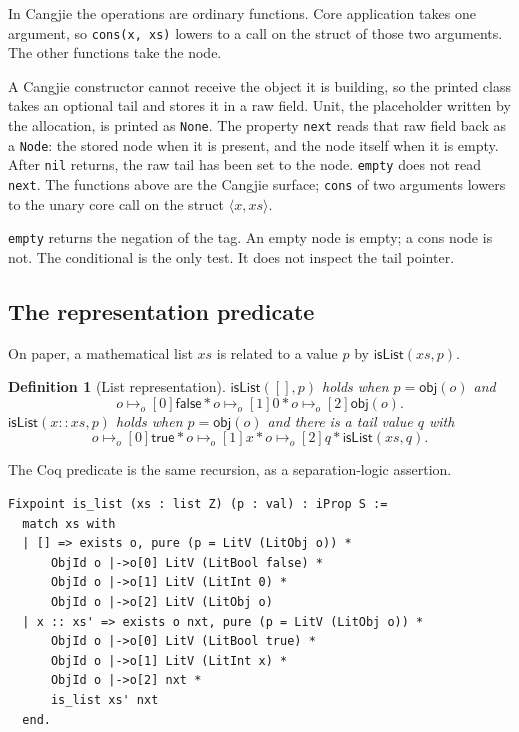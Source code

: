 \documentclass[11pt]{article}
\newtheorem{definition}[theorem]{Definition}
\newcommand{\True}{\mathsf{true}}
\newcommand{\False}{\mathsf{false}}
\newcommand{\ptso}{\mathrel{\mapsto_{o}}}
\newcommand{\sep}{\mathbin{*}}
\begin{document}
In Cangjie the operations are ordinary functions.
Core application takes one argument, so \texttt{cons(x, xs)} lowers to a call on the struct of those two arguments.
The other functions take the node.



A Cangjie constructor cannot receive the object it is building, so the printed class takes an optional tail and stores it in a raw field.
Unit, the placeholder written by the allocation, is printed as \texttt{None}.
The property \texttt{next} reads that raw field back as a \texttt{Node}: the stored node when it is present, and the node itself when it is empty.
After \texttt{nil} returns, the raw tail has been set to the node.
\texttt{empty} does not read \texttt{next}.
The functions above are the Cangjie surface; \texttt{cons} of two arguments lowers to the unary core call on the struct \(\langle x, xs\rangle\).

\texttt{empty} returns the negation of the tag.
An empty node is empty; a cons node is not.
The conditional is the only test.
It does not inspect the tail pointer.

\subsection{The representation predicate}

On paper, a mathematical list \(xs\) is related to a value \(p\) by \(\mathsf{isList}(xs, p)\).

\begin{definition}[List representation]
\(\mathsf{isList}([], p)\) holds when \(p = \mathsf{obj}(o)\) and
\[
o \ptso[0] \False
\sep
o \ptso[1] 0
\sep
o \ptso[2] \mathsf{obj}(o).
\]
\(\mathsf{isList}(x :: xs, p)\) holds when \(p = \mathsf{obj}(o)\) and there is a tail value \(q\) with
\[
o \ptso[0] \True
\sep
o \ptso[1] x
\sep
o \ptso[2] q
\sep
\mathsf{isList}(xs, q).
\]
\end{definition}

The Coq predicate is the same recursion, as a separation-logic assertion.

\begin{lstlisting}
Fixpoint is_list (xs : list Z) (p : val) : iProp S :=
  match xs with
  | [] => exists o, pure (p = LitV (LitObj o)) *
      ObjId o |->o[0] LitV (LitBool false) *
      ObjId o |->o[1] LitV (LitInt 0) *
      ObjId o |->o[2] LitV (LitObj o)
  | x :: xs' => exists o nxt, pure (p = LitV (LitObj o)) *
      ObjId o |->o[0] LitV (LitBool true) *
      ObjId o |->o[1] LitV (LitInt x) *
      ObjId o |->o[2] nxt *
      is_list xs' nxt
  end.
\end{lstlisting}
\end{document}

